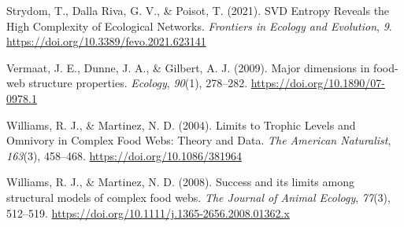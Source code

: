 \documentclass[
]{article}
\newlength{\cslhangindent}
\newenvironment{CSLReferences}[2] %
 {\begin{list}{}{%
  \setlength{\itemindent}{0pt}
  \setlength{\leftmargin}{0pt}
  \setlength{\parsep}{0pt}
  \ifodd #1
   \setlength{\leftmargin}{\cslhangindent}
   \setlength{\itemindent}{-1\cslhangindent}
  \fi
  \setlength{\itemsep}{#2\baselineskip}}}
 {\end{list}}
\begin{document}
\begin{CSLReferences}{1}{0}
Strydom, T., Dalla Riva, G. V., \& Poisot, T. (2021). {SVD Entropy
Reveals} the {High Complexity} of {Ecological Networks}. \emph{Frontiers
in Ecology and Evolution}, \emph{9}.
\url{https://doi.org/10.3389/fevo.2021.623141}

Vermaat, J. E., Dunne, J. A., \& Gilbert, A. J. (2009). Major dimensions
in food-web structure properties. \emph{Ecology}, \emph{90}(1),
278--282. \url{https://doi.org/10.1890/07-0978.1}

Williams, R. J., \& Martinez, N. D. (2004). Limits to {Trophic Levels}
and {Omnivory} in {Complex Food Webs}: {Theory} and {Data}. \emph{The
American Naturalist}, \emph{163}(3), 458--468.
\url{https://doi.org/10.1086/381964}

Williams, R. J., \& Martinez, N. D. (2008). Success and its limits among
structural models of complex food webs. \emph{The Journal of Animal
Ecology}, \emph{77}(3), 512--519.
\url{https://doi.org/10.1111/j.1365-2656.2008.01362.x}

\end{CSLReferences}
\end{document}
